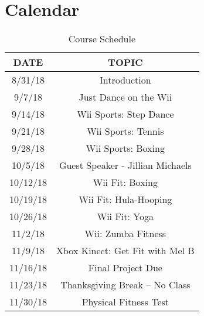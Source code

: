 \documentclass[letterpaper,12pt]{article}
\begin{document}
\section{Calendar}
\begin{table}[ht]
\begin{center}
\caption{Course Schedule}
\label{tbl:bins} %
\begin{tabular}{|cc|} 
\hline
\multicolumn{1}{|c}{DATE} & \multicolumn{1}{c|}{TOPIC} \\
\hline
8/31/18 &   Introduction                      \\
9/7/18 &   Just Dance on the Wii \\
9/14/18 &   Wii Sports: Step Dance \\
9/21/18 &   Wii Sports: Tennis \\
9/28/18 &   Wii Sports:  Boxing\\
10/5/18 &   Guest Speaker - Jillian Michaels \\
10/12/18 &   Wii Fit: Boxing \\
10/19/18 &   Wii Fit: Hula-Hooping \\
10/26/18 &   Wii Fit: Yoga \\
11/2/18 &   Wii: Zumba Fitness \\
11/9/18 &   Xbox Kinect: Get Fit with Mel B  \\
11/16/18 &   Final Project Due  \\
11/23/18 &   Thanksgiving Break -- No Class \\
11/30/18 &   Physical Fitness Test \\
\hline
\end{tabular}
\end{center}
\end{table}
\end{document}
